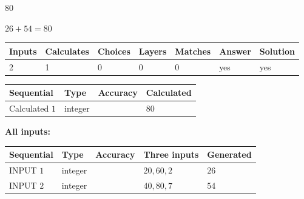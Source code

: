 \documentclass{ctexart}
\begin{document}
 

80
 
 
\noindent{}
 
 

 
 
 
\noindent{}
 
 

$ %
26 +  %
54=   %
80$
 
 
\noindent{}
 
 

 
   
   
   
   
\noindent\begin{tabular}{|l|l|l|l|l|l|l|}
 \hline
Inputs & Calculates & Choices & Layers & Matches & Answer & Solution \\ \hline
 2  & 
 1  & 
 0
  & 
 0  & 
 0  & 
  yes & 
  yes 
  \\ \hline
 \end{tabular}
   
   
   
   
\noindent{}
   
   
  
  
\noindent\begin{tabular}{|l|l|l|l|}
\hline
 Sequential & Type & Accuracy & Calculated \\ 
\hline
 
 
  Calculated $  1 $ & integer &  & 
  $ 80 $ 
 \\  \hline  
 \end{tabular}
   
   
   
   
\noindent\vspace{0.1in}\hspace{-0.08in} {\textbf{\Large{All inputs: }}}
   
   
  
  
\noindent\begin{tabular}{|l|l|l|l|l|}
\hline
 Sequential & Type & Accuracy & Three inputs & Generated \\ 
\hline
 
 
  INPUT $  1 $ & integer &  & $
 20
 , 
 60
 , 
 2
 $ & $ 26 $ 
 \\  \hline  
 
 
  INPUT $  2 $ & integer &  & $
 40
 , 
 80
 , 
 7
 $ & $ 54 $ 
 \\  \hline  
 \end{tabular}
   
\end{document}
